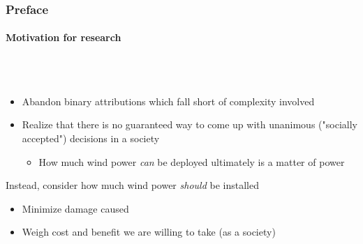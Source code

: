\documentclass[aspectratio=1610, xcolor=dvipsnames]{beamer}
\begin{document}
    \begin{frame}
        \frametitle{Preface}
        \framesubtitle{Motivation for research}
         \\~\\
        \begin{itemize}
            \item Abandon binary attributions which fall short of complexity involved
            \item Realize that there is no guaranteed way to come up with unanimous ("socially accepted") decisions in a society
            \begin{itemize}
                \item How much wind power \emph{can} be deployed ultimately is a matter of power
            \end{itemize}
        \end{itemize}
        \medskip
        Instead, consider how much wind power \emph{should} be installed
        \begin{itemize}
            \item Minimize damage caused
            \item Weigh cost and benefit we are willing to take (as a society)
        \end{itemize}
    \end{frame}
\end{document}
